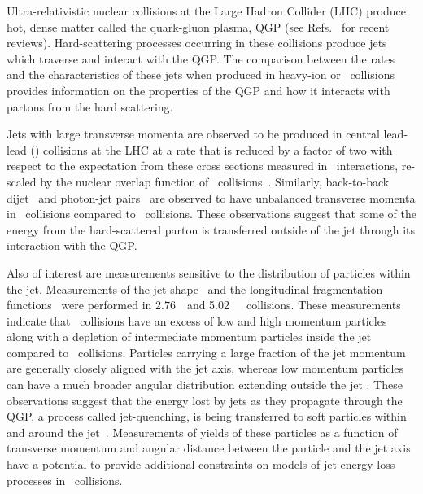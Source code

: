 
Ultra-relativistic nuclear collisions at the Large Hadron Collider (LHC) produce hot, dense matter
called the quark-gluon plasma, QGP (see Refs.~\cite{Roland:2014jsa,Busza:2018rrf} for recent reviews).
Hard-scattering processes occurring in these collisions produce jets which
traverse and interact with the QGP. The comparison between the rates and the characteristics of these jets when produced in heavy-ion or \pp\ collisions provides information on the properties of the QGP and how it interacts with partons from the hard scattering.

Jets with large transverse momenta are observed to be produced in central lead-lead (\pbpb) collisions at the LHC at a rate that is reduced by a factor of two with respect to the expectation from these cross sections measured in \pp\ interactions, re-scaled by the nuclear overlap function of \pbpb\ collisions~\cite{Abelev:2013kqa,Aad:2014bxa,Khachatryan:2016jfl, 2019108}. 
Similarly, back-to-back dijet~\cite{Aad:2010bu,Chatrchyan:2011sx,Aaboud:2017eww} 
and photon-jet pairs~\cite{Chatrchyan:2012gt} are observed to have
unbalanced transverse momenta in \pbpb\ collisions compared to \pp\ collisions.
These observations suggest that some of the energy from the hard-scattered parton is
transferred outside of the jet through its interaction with the QGP.  

Also of interest are measurements sensitive to the distribution of particles
within the jet.  Measurements of the jet shape~\cite{Chatrchyan:2013kwa} and  the longitudinal fragmentation functions~\cite{Aad:2014wha,Chatrchyan:2014ava,Aaboud:2017bzv, PhysRevC.98.024908} were performed in 2.76~\TeV\ and 5.02~\TeV\ \pbpb\
collisions.
These measurements indicate that \pbpb\ collisions have an excess of low and high momentum particles along with a depletion of intermediate momentum particles inside the jet compared to \pp\ collisions. Particles carrying a large fraction of the jet momentum are generally closely
aligned with the jet axis, whereas low momentum particles can have a much broader
angular distribution extending outside the jet \cite{Khachatryan:2016tfj,Sirunyan:2018jqr}. 
These observations suggest that the energy lost by jets as they propagate through the QGP, a process called jet-quenching, is being transferred to soft particles within and around the jet~\cite{Qin:2015srf,Blaizot:2014ula}. Measurements of yields of these particles as a function of transverse momentum and
angular distance between the particle and the jet axis have a potential to provide additional constraints on models of jet energy loss processes in \pbpb\ collisions.

